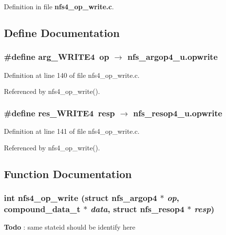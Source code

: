 Definition in file {\bf nfs4\_\-op\_\-write.c}.

\subsection{Define Documentation}
\subsubsection{\setlength{\rightskip}{0pt plus 5cm}\#define arg\_\-WRITE4\ op $\rightarrow$ nfs\_\-argop4\_\-u.opwrite}\label{nfs4__op__write_8c_a0}




Definition at line 140 of file nfs4\_\-op\_\-write.c.

Referenced by nfs4\_\-op\_\-write().
\subsubsection{\setlength{\rightskip}{0pt plus 5cm}\#define res\_\-WRITE4\ resp $\rightarrow$ nfs\_\-resop4\_\-u.opwrite}\label{nfs4__op__write_8c_a1}




Definition at line 141 of file nfs4\_\-op\_\-write.c.

Referenced by nfs4\_\-op\_\-write().

\subsection{Function Documentation}
\subsubsection{\setlength{\rightskip}{0pt plus 5cm}int nfs4\_\-op\_\-write (struct nfs\_\-argop4 $\ast$ {\em op}, compound\_\-data\_\-t $\ast$ {\em data}, struct nfs\_\-resop4 $\ast$ {\em resp})}\label{nfs4__op__write_8c_a3}


\begin{Desc}
\item[{\bf Todo}]: same stateid should be identify here\end{Desc}



